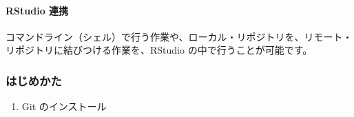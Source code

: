 \documentclass[
]{bxjsbook}
\providecommand{\tightlist}{%
  \setlength{\itemsep}{0pt}\setlength{\parskip}{0pt}}
\theoremstyle{definition}
\theoremstyle{definition}
\theoremstyle{definition}
\theoremstyle{definition}
\theoremstyle{remark}
\begin{document}
\hypertarget{rstudio-ux9023ux643a}{%
\paragraph{RStudio 連携}\label{rstudio-ux9023ux643a}}

コマンドライン（シェル）で行う作業や、ローカル・リポジトリを、リモート・リポジトリに結びつける作業を、RStudio の中で行うことが可能です。

\hypertarget{ux306fux3058ux3081ux304bux305f}{%
\subsubsection{はじめかた}\label{ux306fux3058ux3081ux304bux305f}}

\begin{enumerate}
\def\labelenumi{\arabic{enumi}.}
\tightlist
\item
  Git のインストール
\end{enumerate}
\end{document}
